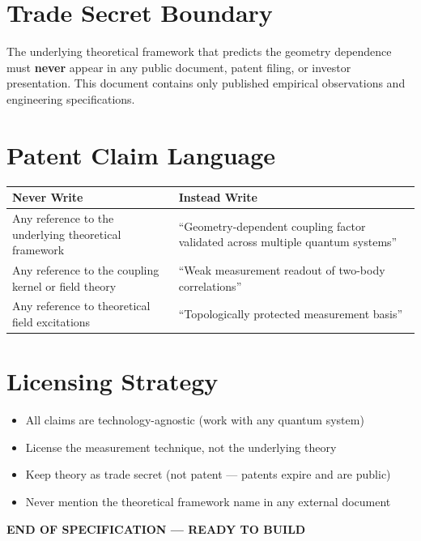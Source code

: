 \documentclass[11pt,a4paper,openany]{book}
\begin{document}
\section*{Trade Secret Boundary}

The underlying theoretical framework that predicts the geometry dependence must \textbf{never} appear in any public document, patent filing, or investor presentation. This document contains only published empirical observations and engineering specifications.

\section*{Patent Claim Language}

\begin{center}
\begin{tabularx}{\textwidth}{|X|X|}
\hline
\textbf{Never Write} & \textbf{Instead Write} \\
\hline
Any reference to the underlying theoretical framework & ``Geometry-dependent coupling factor validated across multiple quantum systems'' \\
\hline
Any reference to the coupling kernel or field theory & ``Weak measurement readout of two-body correlations'' \\
\hline
Any reference to theoretical field excitations & ``Topologically protected measurement basis'' \\
\hline
\end{tabularx}
\end{center}

\section*{Licensing Strategy}

\begin{itemize}[nosep]
  \item All claims are technology-agnostic (work with any quantum system)
  \item License the measurement technique, not the underlying theory
  \item Keep theory as trade secret (not patent --- patents expire and are public)
  \item Never mention the theoretical framework name in any external document
\end{itemize}

\vfill

\begin{center}
\large
\textcolor{passgreen}{\textbf{END OF SPECIFICATION --- READY TO BUILD}}
\end{center}
\end{document}
